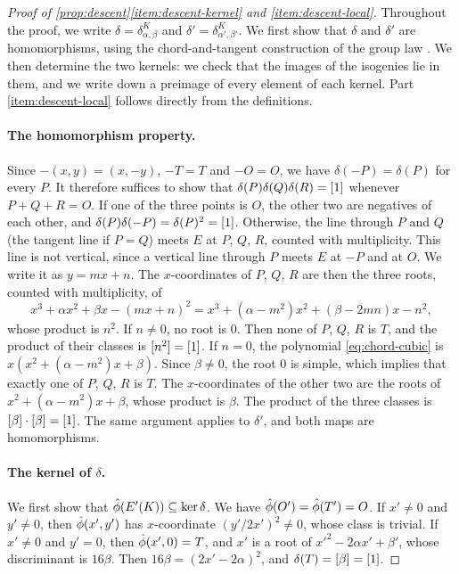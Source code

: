 \begin{proof}[Proof of \cref{prop:descent}\ref{item:descent-kernel} and \ref{item:descent-local}]
Throughout the proof, we write $\delta=\delta^K_{\alpha,\beta}$ and $\delta'=\delta^K_{\alpha',\beta'}$. We first show that $\delta$ and $\delta'$ are homomorphisms, using the chord-and-tangent construction of the group law \cite[Section~III.2, especially Proposition~III.2.2]{SilvermanAEC}. We then determine the two kernels: we check that the images of the isogenies lie in them, and we write down a preimage of every element of each kernel. Part \ref{item:descent-local} follows directly from the definitions.

\paragraph{The homomorphism property.} Since $-(x,y)=(x,-y)$, $-T=T$ and $-O=O$, we have $\delta(-P)=\delta(P)$ for every $P$. It therefore suffices to show that $\delta(P)\delta(Q)\delta(R)=[1]$ whenever $P+Q+R=O$. If one of the three points is $O$, the other two are negatives of each other, and $\delta(P)\delta(-P)=\delta(P)^2=[1]$. Otherwise, the line through $P$ and $Q$ (the tangent line if $P=Q$) meets $E$ at $P$, $Q$, $R$, counted with multiplicity. This line is not vertical, since a vertical line through $P$ meets $E$ at $-P$ and at $O$. We write it as $y=mx+n$. The $x$-coordinates of $P$, $Q$, $R$ are then the three roots, counted with multiplicity, of
\begin{equation}\label{eq:chord-cubic}
x^3+\alpha x^2+\beta x-(mx+n)^2=x^3+(\alpha-m^2)x^2+(\beta-2mn)x-n^2,
\end{equation}
whose product is $n^2$. If $n\ne0$, no root is $0$. Then none of $P$, $Q$, $R$ is $T$, and the product of their classes is $[n^2]=[1]$. If $n=0$, the polynomial \eqref{eq:chord-cubic} is $x(x^2+(\alpha-m^2)x+\beta)$. Since $\beta\ne0$, the root $0$ is simple, which implies that exactly one of $P$, $Q$, $R$ is $T$. The $x$-coordinates of the other two are the roots of $x^2+(\alpha-m^2)x+\beta$, whose product is $\beta$. The product of the three classes is $[\beta]\cdot[\beta]=[1]$. The same argument applies to $\delta'$, and both maps are homomorphisms.

\paragraph{The kernel of $\delta$.} We first show that $\hat\phi(E'(K))\subseteq\ker\delta$. We have $\hat\phi(O')=\hat\phi(T')=O$. If $x'\ne0$ and $y'\ne0$, then $\hat\phi(x',y')$ has $x$-coordinate $(y'/2x')^2\ne0$, whose class is trivial. If $x'\ne0$ and $y'=0$, then $\hat\phi(x',0)=T$, and $x'$ is a root of $x'^2-2\alpha x'+\beta'$, whose discriminant is $16\beta$. Then $16\beta=(2x'-2\alpha)^2$, and $\delta(T)=[\beta]=[1]$.


\end{proof}
